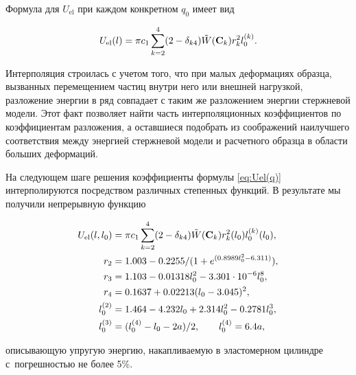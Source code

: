 Формула для $U_{\text{el}}$ при каждом конкретном $q_0$ имеет вид

\begin{equation}

\label{eq:Uel(q)}%

U_{\text{el}}(l)  = \pi c_1 \sum_{k=2}^4 (2-\delta_{k4}) \tilde W({\bf C}_k) r_k^2 l_0^{(k)}.

\end{equation}

Интерполяция строилась с учетом того, что при малых деформациях образца, вызванных перемещением частиц внутри него или внешней нагрузкой, разложение энергии в ряд совпадает с таким же разложением энергии стержневой модели. Этот факт позволяет найти часть интерполяционных коэффициентов по коэффициентам разложения, а оставшиеся подобрать из соображений наилучшего соответствия между энергией стержневой модели и расчетного образца в области больших деформаций.



На следующем шаге решения коэффициенты формулы \eqref{eq:Uel(q)} интерполируются посредством различных степенных функций. В результате мы получили непрерывную функцию

\begin{align}                                                          \label{eq:Uel}%

U_{\text{el}}(l,l_0) &= \pi c_1 \sum_{k=2}^4 (2-\delta_{k4}) \tilde W({\bf C}_k) r_k^2(l_0) l_0^{(k)}(l_0),\\

r_2 &= 1.003-0.2255/(1+e^{(0.8989 l_0^2-6.311)}),\nonumber\\

r_3 &= 1.103 - 0.01318 l_0^2 - 3.301 \cdot 10^{-6} l_0^8,\nonumber\\

r_4 &= 0.1637+0.02213 (l_0-3.045)^2,\nonumber\\

l_0^{(2)} &= 1.464 - 4.232 l_0 + 2.314 l_0^2 - 0.2781 l_0^3,\nonumber\\

l_0^{(3)} &= (l_0^{(4)}- l_0-2a)/2, \qquad l_0^{(4)} = 6.4a,\nonumber

\end{align}

описывающую упругую энергию, накапливаемую в эластомерном цилиндре с~погрешностью не более 5\%.



